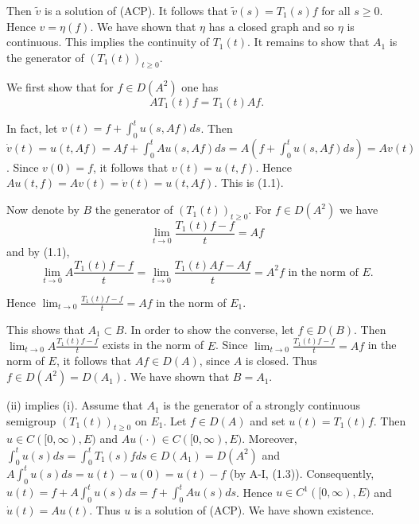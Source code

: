 
Then $\tilde{v}$ is a solution of (ACP).
It follows that $\tilde{v}(s) = T_{1}(s)f$ for all $s \geq 0$.
Hence $v = \eta(f)$.
We have shown that $\eta$ has a closed graph and so $\eta$ is continuous.
This implies the continuity of $T_{1}(t)$.
It remains to show that $A_{1}$ is the generator of $(T_{1}(t))_{t\geq0}$.

We first show that for $f \in D(A^{2})$ one has
\[
AT_{1}(t)f = T_{1}(t)Af. \tag{1.1}
\]

In fact, let $v(t) = f + \int_{0}^{t} u(s,Af) ds$.
Then $\dot{v}(t) = u(t,Af) = Af + \int_{0}^{t} Au(s,Af) ds = A(f + \int_{0}^{t} u(s,Af) ds) = Av(t)$.
Since $v(0) = f$, it follows that $v(t) = u(t,f)$.
Hence $Au(t,f) = Av(t) = \dot{v}(t) = u(t,Af)$.
This is (1.1).

Now denote by $B$ the generator of $(T_{1}(t))_{t\geq0}$.
For $f \in D(A^{2})$ we have
\[
\lim_{t \to 0} \frac{T_{1}(t)f - f}{t} = Af
\]
and by (1.1),
\[
\lim_{t \to 0} A \frac{T_{1}(t)f - f}{t} = \lim_{t \to 0} \frac{T_{1}(t)Af - Af}{t} = A^{2}f \text{ in the norm of } E.
\]

Hence $\lim_{t \to 0} \frac{T_{1}(t)f - f}{t} = Af$ in the norm of $E_{1}$.

This shows that $A_{1} \subset B$.
In order to show the converse, let $f \in D(B)$.
Then $\lim_{t \to 0} A \frac{T_{1}(t)f - f}{t}$ exists in the norm of $E$.
Since $\lim_{t \to 0} \frac{T_{1}(t)f - f}{t} = Af$ in the norm of $E$, it follows that $Af \in D(A)$, since $A$ is closed.
Thus $f \in D(A^{2}) = D(A_{1})$.
We have shown that $B = A_{1}$.

(ii) implies (i).
Assume that $A_{1}$ is the generator of a strongly continuous semigroup $(T_{1}(t))_{t\geq0}$ on $E_{1}$.
Let $f \in D(A)$ and set $u(t) = T_{1}(t)f$.
Then $u \in C([0,\infty),E)$ and $Au(\cdot) \in C([0,\infty),E)$.
Moreover, $\int_{0}^{t} u(s)ds = \int_{0}^{t} T_{1}(s)fds \in D(A_{1}) = D(A^{2})$ and $A\int_{0}^{t} u(s)ds = u(t) - u(0) = u(t) - f$ (by A-I, (1.3)).
Consequently, $u(t) = f + A\int_{0}^{t} u(s)ds = f + \int_{0}^{t} Au(s)ds$.
Hence $u \in C^{1}([0,\infty),E)$ and $\dot{u}(t) = Au(t)$.
Thus $u$ is a solution of (ACP).
We have shown existence.